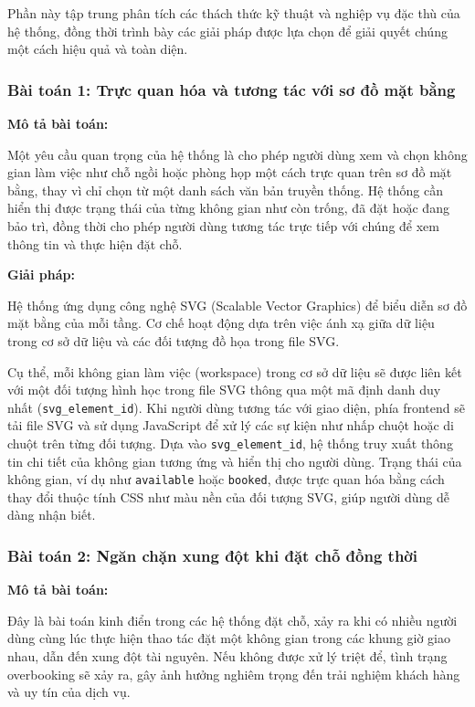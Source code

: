 Phần này tập trung phân tích các thách thức kỹ thuật và nghiệp vụ đặc thù của hệ thống, đồng thời trình bày các giải pháp được lựa chọn để giải quyết chúng một cách hiệu quả và toàn diện.

\subsubsection{Bài toán 1: Trực quan hóa và tương tác với sơ đồ mặt bằng}

\textbf{Mô tả bài toán:}

Một yêu cầu quan trọng của hệ thống là cho phép người dùng xem và chọn không gian làm việc như chỗ ngồi hoặc phòng họp một cách trực quan trên sơ đồ mặt bằng, thay vì chỉ chọn từ một danh sách văn bản truyền thống. Hệ thống cần hiển thị được trạng thái của từng không gian như còn trống, đã đặt hoặc đang bảo trì, đồng thời cho phép người dùng tương tác trực tiếp với chúng để xem thông tin và thực hiện đặt chỗ.

\textbf{Giải pháp:}

Hệ thống ứng dụng công nghệ SVG (Scalable Vector Graphics) để biểu diễn sơ đồ mặt bằng của mỗi tầng. Cơ chế hoạt động dựa trên việc ánh xạ giữa dữ liệu trong cơ sở dữ liệu và các đối tượng đồ họa trong file SVG.

Cụ thể, mỗi không gian làm việc (workspace) trong cơ sở dữ liệu sẽ được liên kết với một đối tượng hình học trong file SVG thông qua một mã định danh duy nhất (\texttt{svg\_element\_id}). Khi người dùng tương tác với giao diện, phía frontend sẽ tải file SVG và sử dụng JavaScript để xử lý các sự kiện như nhấp chuột hoặc di chuột trên từng đối tượng. Dựa vào \texttt{svg\_element\_id}, hệ thống truy xuất thông tin chi tiết của không gian tương ứng và hiển thị cho người dùng. Trạng thái của không gian, ví dụ như \texttt{available} hoặc \texttt{booked}, được trực quan hóa bằng cách thay đổi thuộc tính CSS như màu nền của đối tượng SVG, giúp người dùng dễ dàng nhận biết.

\subsubsection{Bài toán 2: Ngăn chặn xung đột khi đặt chỗ đồng thời}

\textbf{Mô tả bài toán:}

Đây là bài toán kinh điển trong các hệ thống đặt chỗ, xảy ra khi có nhiều người dùng cùng lúc thực hiện thao tác đặt một không gian trong các khung giờ giao nhau, dẫn đến xung đột tài nguyên. Nếu không được xử lý triệt để, tình trạng overbooking sẽ xảy ra, gây ảnh hưởng nghiêm trọng đến trải nghiệm khách hàng và uy tín của dịch vụ.

